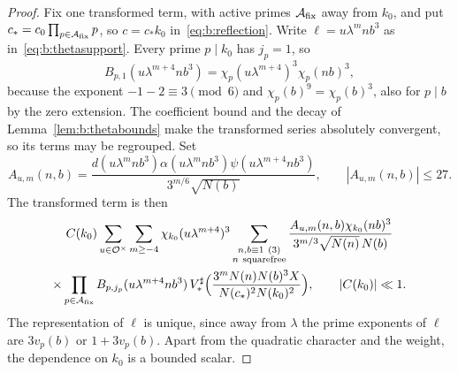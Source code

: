 \begin{proof}
Fix one transformed term, with active primes $\mathcal A_{\rm fix}$ away from $k_0$, and put $c_*=c_0\prod_{p\in\mathcal A_{\rm fix}}p$, so $c=c_*k_0$ in~\eqref{eq:b:reflection}. Write $\ell=u\lambda^mnb^3$ as in~\eqref{eq:b:thetasupport}. Every prime $p\mid k_0$ has $j_p=1$, so
\begin{equation}\label{eq:b:residualquadratic}
  B_{p,1}(u\lambda^{m+4}nb^3)=\chi_p(u\lambda^{m+4})^3\chi_p(nb)^3,
\end{equation}
because the exponent $-1-2\equiv3\pmod6$ and $\chi_p(b)^9=\chi_p(b)^3$, also for $p\mid b$ by the zero extension. The coefficient bound and the decay of Lemma~\ref{lem:b:thetabounds} make the transformed series absolutely convergent, so its terms may be regrouped. Set
\[
  A_{u,m}(n,b)=\frac{d(u\lambda^mnb^3)\alpha(u\lambda^mnb^3)\psi(u\lambda^{m+4}nb^3)}{3^{m/6}\sqrt{N(b)}},\qquad|A_{u,m}(n,b)|\le27.
\]
The transformed term is then
\begin{multline*}
  C(k_0)\sum_{u\in\OO^\times}\sum_{m\ge-4}\chi_{k_0}(u\lambda^{m+4})^3\sum_{\substack{n,b\equiv1\ (3)\\n\ {\rm squarefree}}}\frac{A_{u,m}(n,b)\chi_{k_0}(nb)^3}{3^{m/3}\sqrt{N(n)}\,N(b)}\\
  \times\prod_{p\in\mathcal A_{\rm fix}}B_{p,j_p}(u\lambda^{m+4}nb^3)\,V_*^\sharp\Bigl(\frac{3^mN(n)N(b)^3X}{N(c_*)^2N(k_0)^2}\Bigr),\qquad|C(k_0)|\ll1.
\end{multline*}
The representation of $\ell$ is unique, since away from $\lambda$ the prime exponents of $\ell$ are $3v_p(b)$ or $1+3v_p(b)$. Apart from the quadratic character and the weight, the dependence on $k_0$ is a bounded scalar.


\end{proof}
